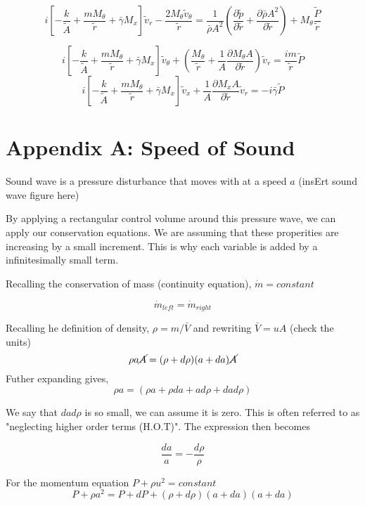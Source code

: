 \[ i\left[ 
- \frac{k}{\tilde{A}} + 
\frac{m M_{\theta}}{\tilde{r}} + 
\bar{\gamma} M_x 
\right] \tilde{v}_r - 
\frac{2 M_{\theta} \tilde{v}_{\theta}}{\tilde{r}} = 
\frac{1}{\bar{\rho} A^2}\left( \frac{\partial \tilde{p}}{\partial \tilde{r}} +
\frac{\partial \bar{\rho} A^2}{\partial \tilde{r}}  \right)+ 
M_{\theta}\frac{\tilde{P}}{\tilde{r}}\]


\[i\left[ - \frac{k}{\tilde{A}} + \frac{m M_{\theta}}{\tilde{r}} + \bar{\gamma} M_x \right] \tilde{v}_{\theta} + \left(\frac{ M_{\theta}}{\tilde{r}}  + \frac{1}{A} \frac{\partial M_{\theta}A}{\partial \tilde{r}}\right)\tilde{v}_r = \frac{i m}{\tilde{r}}\tilde{P}\]
\[i\left[ - \frac{k}{\tilde{A}} + \frac{m M_{\theta}}{\tilde{r}} + \bar{\gamma} M_x \right] \tilde{v}_x  + \frac{1}{A} \frac{\partial M_x A}{\partial \tilde{r}}\tilde{v}_r = -i \bar{\gamma}\tilde{P} \]
\section{Appendix A: Speed of Sound}




Sound wave is a pressure disturbance that moves with at a speed $a$
(insErt sound wave figure here)

By applying a rectangular control volume around this pressure wave, we can apply our conservation equations. We are assuming that these properities are increasing by a small increment. This is why each variable is added by a infinitesimally small term.

Recalling the conservation of mass (continuity equation), $\dot{m} = constant$

\[\dot{m}_{left} = \dot{m}_{right}\]

Recalling he definition of density, $\rho = m/\bar{V}$ and rewriting $\bar{V} = uA$ (check the units)
\[\rho a \cancel{A}  = (\rho + d\rho)(a + da) \cancel{A}\]
Futher expanding gives,
\[\rho a   = (\rho a+ \rho da + a d\rho + da d\rho)\]

We say that $da d\rho$ is so small, we can assume it is zero. This is often referred to as "neglecting higher order terms (H.O.T)". The expression then becomes

\[\frac{da}{a} = -\frac{d \rho}{\rho}\]

For the momentum equation $P + \rho u^2 = constant$
\[P + \rho a^2  = P + dP +  (\rho + d\rho)(a + da)(a + da) \]

